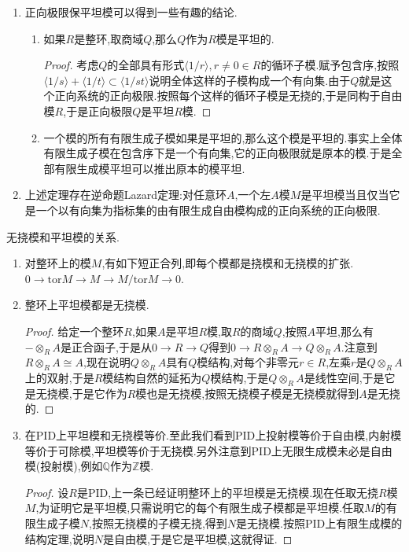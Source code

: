 \begin{enumerate}
\begin{proof}
    	这里$\varphi$和$\psi$是自然的同构.按照每个$F_i$平坦,于是$1_i\otimes k$都是单射.按照有向集上的正向极限保短正合列,得到上述交换图第一行是左正合的,于是$k^*$是单射.这就导致$1\otimes k=\psi k^*\varphi^{-1}$是单射的复合,于是单,于是$\lim_{\rightarrow}F_i$是平坦的.
    \end{proof}
    \item 正向极限保平坦模可以得到一些有趣的结论.
    \begin{enumerate}
    	\item 如果$R$是整环,取商域$Q$,那么$Q$作为$R$模是平坦的.
    	\begin{proof}
    		
    		考虑$Q$的全部具有形式$\langle1/r\rangle,r\not=0\in R$的循环子模.赋予包含序,按照$\langle1/s\rangle+\langle1/t\rangle\subset\langle1/st\rangle$说明全体这样的子模构成一个有向集.由于$Q$就是这个正向系统的正向极限.按照每个这样的循环子模是无挠的,于是同构于自由模$R$,于是正向极限$Q$是平坦$R$模.
    	\end{proof}
    	\item 一个模的所有有限生成子模如果是平坦的,那么这个模是平坦的.事实上全体有限生成子模在包含序下是一个有向集,它的正向极限就是原本的模.于是全部有限生成模平坦可以推出原本的模平坦.
    \end{enumerate}
    \item 上述定理存在逆命题Lazard定理:对任意环$A$,一个左$A$模$M$是平坦模当且仅当它是一个以有向集为指标集的由有限生成自由模构成的正向系统的正向极限.
\end{enumerate}

无挠模和平坦模的关系.
\begin{enumerate}
	\item 对整环上的模$M$,有如下短正合列,即每个模都是挠模和无挠模的扩张.$0\to\mathrm{tor}M\to M\to M/\mathrm{tor}M\to0$.
	\item 整环上平坦模都是无挠模.
	\begin{proof}
		
		给定一个整环$R$,如果$A$是平坦$R$模,取$R$的商域$Q$,按照$A$平坦,那么有$-\otimes_RA$是正合函子,于是从$0\to R\to Q$得到$0\to R\otimes_RA\to Q\otimes_RA$.注意到$R\otimes_RA\cong A$,现在说明$Q\otimes_RA$具有$Q$模结构,对每个非零元$r\in R$,左乘$r$是$Q\otimes_RA$上的双射,于是$R$模结构自然的延拓为$Q$模结构,于是$Q\otimes_RA$是线性空间,于是它是无挠模,于是它作为$R$模也是无挠模,按照无挠模子模是无挠模就得到$A$是无挠的.
	\end{proof}
    \item 在PID上平坦模和无挠模等价.至此我们看到PID上投射模等价于自由模,内射模等价于可除模,平坦模等价于无挠模.另外注意到PID上无限生成模未必是自由模(投射模),例如$\mathbb{Q}$作为$\mathbb{Z}$模.
    \begin{proof}
    	
    	设$R$是PID,上一条已经证明整环上的平坦模是无挠模.现在任取无挠$R$模$M$,为证明它是平坦模,只需说明它的每个有限生成子模都是平坦模.任取$M$的有限生成子模$N$,按照无挠模的子模无挠,得到$N$是无挠模.按照PID上有限生成模的结构定理,说明$N$是自由模,于是它是平坦模,这就得证.
    \end{proof}
\end{enumerate}

